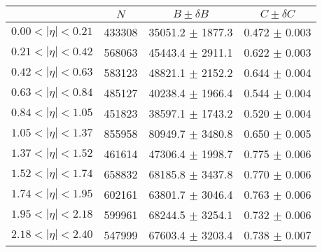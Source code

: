 \begin{tabular}{lccc}
\hline
    &   $N$   & $B \pm \delta B$  &  $C \pm \delta C$ \\
\hline
$0.00 < |\eta| <0.21$          & 433308     & 35051.2    $\pm$ 1877.3 & 0.472      $\pm$ 0.003 \\
$0.21 < |\eta| <0.42$          & 568063     & 45443.4    $\pm$ 2911.1 & 0.622      $\pm$ 0.003 \\
$0.42 < |\eta| <0.63$          & 583123     & 48821.1    $\pm$ 2152.2 & 0.644      $\pm$ 0.004 \\
$0.63 < |\eta| <0.84$          & 485127     & 40238.4    $\pm$ 1966.4 & 0.544      $\pm$ 0.004 \\
$0.84 < |\eta| <1.05$          & 451823     & 38597.1    $\pm$ 1743.2 & 0.520      $\pm$ 0.004 \\
$1.05 < |\eta| <1.37$          & 855958     & 80949.7    $\pm$ 3480.8 & 0.650      $\pm$ 0.005 \\
$1.37 < |\eta| <1.52$          & 461614     & 47306.4    $\pm$ 1998.7 & 0.775      $\pm$ 0.006 \\
$1.52 < |\eta| <1.74$          & 658832     & 68185.8    $\pm$ 3437.8 & 0.770      $\pm$ 0.006 \\
$1.74 < |\eta| <1.95$          & 602161     & 63801.7    $\pm$ 3046.4 & 0.763      $\pm$ 0.006 \\
$1.95 < |\eta| <2.18$          & 599961     & 68244.5    $\pm$ 3254.1 & 0.732      $\pm$ 0.006 \\
$2.18 < |\eta| <2.40$          & 547999     & 67603.4    $\pm$ 3203.4 & 0.738      $\pm$ 0.007 \\
\hline
\end{tabular}
